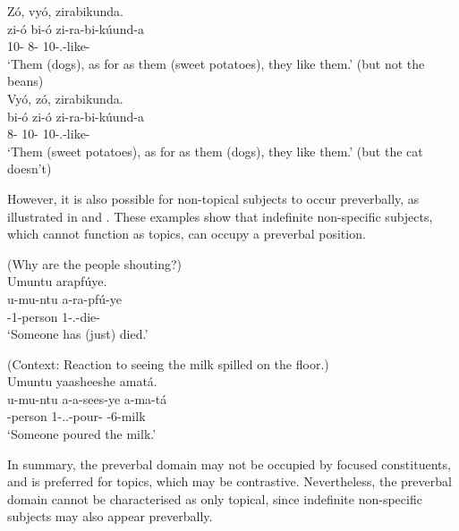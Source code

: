 \documentclass[output=paper]{langscibook}
\begin{document}
\ex
\label{bkm:Ref142552207:b}
Zó, vyó, zirabikunda.\\
\gll
zi-ó  bi-ó  zi-ra-bi-kúund-a\\
10-\PRO{}  8-\PRO{}  10\SM-\PRS.\OM-{}like-\FV{}\\
\glt
‘Them (dogs), as for as them (sweet potatoes), they like them.’ (but not the beans)\\

\ex
\label{bkm:Ref142552207:c}
Vyó, zó, zirabikunda.\\
\gll
bi-ó  zi-ó  zi-ra-bi-kúund-a\\
8-\PRO{}  10-\PRO{}  10\SM-\PRS.\OM-{}like-\FV{}\\
\glt
‘Them (sweet potatoes), as for as them (dogs), they like them.’ (but the cat doesn't)\\

\z
\z

However, it is also possible for non-topical subjects to occur preverbally, as illustrated in  and . These examples show that indefinite non-specific subjects, which cannot function as topics, can occupy a preverbal position.

\ea
\label{bkm:Ref75348847}
(Why are the people shouting?)\\
Umuntu arapfúye.\\
\gll
u-mu-ntu  a-ra-pfú-ye\\
\AUG{}-1-person  1\SM-\PRS.\DJ{}-die-\PFV{}\\
\glt
‘Someone has (just) died.’\\

\z

\ea
\label{bkm:Ref75339354}
(Context: Reaction to seeing the milk spilled on the floor.)\\
Umuntu yaasheeshe amatá.\\
\gll
u-mu-ntu  a-a-sees-ye  a-ma-tá\\
-person  1\SM-\N.\PST.\DJ{}-pour-\PFV{}  \AUG{}-6-milk\\
\glt
‘Someone poured the milk.’\\

\z

In summary, the preverbal domain may not be occupied by focused constituents, and is preferred for topics, which may be contrastive. Nevertheless, the preverbal domain cannot be characterised as only topical, since indefinite non-specific subjects may also appear preverbally. 
\end{document}

